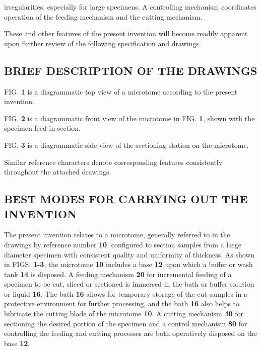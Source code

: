 \documentclass{article}
\begin{document}
irregularities, especially for large specimens. A controlling mechanism coordinates operation of the feeding mechanism and the cutting mechanism.

These and other features of the present invention will become readily apparent upon further review of the following specification and drawings.

\subsection*{BRIEF DESCRIPTION OF THE DRAWINGS}

FIG. \textbf{1} is a diagrammatic top view of a microtome according to the present invention.

FIG. \textbf{2} is a diagrammatic front view of the microtome in FIG. \textbf{1}, shown with the specimen feed in section.

FIG. \textbf{3} is a diagrammatic side view of the sectioning station on the microtome.

Similar reference characters denote corresponding features consistently throughout the attached drawings.

\subsection*{BEST MODES FOR CARRYING OUT THE INVENTION}

The present invention relates to a microtome, generally referred to in the drawings by reference number \textbf{10}, configured to section samples from a large diameter specimen with consistent quality and uniformity of thickness. As shown in FIGS. \textbf{1-3}, the microtome \textbf{10} includes a base \textbf{12} upon which a buffer or wash tank \textbf{14} is disposed. A feeding mechanism \textbf{20} for incremental feeding of a specimen to be cut, sliced or sectioned is immersed in the bath or buffer solution or liquid \textbf{16}. The bath \textbf{16} allows for temporary storage of the cut samples in a protective environment for further processing, and the bath \textbf{16} also helps to lubricate the cutting blade of the microtome \textbf{10}. A cutting mechanism \textbf{40} for sectioning the desired portion of the specimen and a control mechanism \textbf{80} for controlling the feeding and cutting processes are both operatively disposed on the base \textbf{12}.
\end{document}
